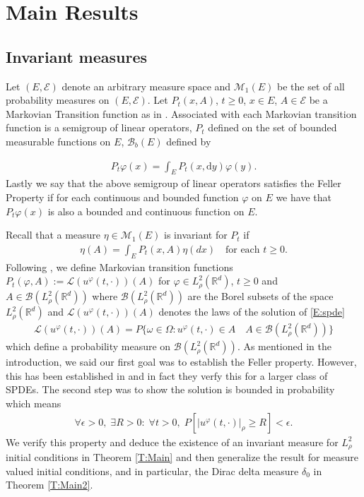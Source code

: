 \documentclass[a4paper,11pt]{article}%
\numberwithin{equation}{section}
\theoremstyle{plain}
\theoremstyle{definition}
\newcommand{\R}{\mathbb{R}}
\newcommand{\ud}{\ensuremath{ \mathrm{d} }}
\begin{document}
\section{Main Results}
\subsection{Invariant measures}
Let $(E, \mathscr E)$ denote an arbitrary measure space and $\mathcal M_1(E)$ be the set of all probability measures on $(E, \mathscr E)$. Let $P_t(x,A)$, $t\ge0$, $x\in E$, $A \in \mathscr E$ be a Markovian Transition function as in \cite{DZ96}. Associated with each Markovian transition function is a semigroup of linear operators, $P_t$ defined on the set of bounded measurable functions on $E$, $\mathcal B_b(E)$ defined by

\begin{align*}
	P_t \varphi (x) = \int_E P_t(x,\ud y)\varphi(y).
\end{align*}
Lastly we say that the above semigroup of linear operators satisfies the Feller Property if for each continuous and bounded function $\varphi$ on $E$ we have that $P_t\varphi (x)$ is also a bounded and continuous function on $E$.

Recall that a measure $\eta \in \mathcal M_1(E)$ is invariant for $P_t$ if
\begin{align*}
	\eta(A)=\int_E P_t(x,A)\eta(dx) \quad \text{for each $t\ge 0$}.
\end{align*}
Following \cite{DZ96}, we define Markovian transition functions $P_t(\varphi,A) := \mathscr L (u^\varphi(t,\cdot))(A)$ for $\varphi \in L^2_{\rho}(\R^d)$, $t \ge 0$ and $A \in \mathscr B (L^2_{\rho}(\R^d))$ where $\mathscr B (L^2_\rho(\R^d))$ are the Borel subsets of the space $L^2_\rho(\R^d)$ and $\mathscr L (u^\varphi(t,\cdot))(A)$ denotes the laws of the solution of \eqref{E:spde}
\begin{align*}
	\mathscr L (u^\varphi(t,\cdot))(A) = P\{\omega \in \Omega : u^\varphi(t,\cdot) \in A \quad A \in \mathscr B(L^2_\rho(\R^d))\}
\end{align*}
which define a probability measure on $\mathscr B(L^2_\rho(\R^d))$. As mentioned in the introduction, we said our first goal was to establish the Feller property. However, this has been established in \cite{DZ96} and in fact they verfy this for a larger class of SPDEs. The second step was to show the solution is bounded in probability which means
\begin{align*}
	\forall \epsilon >0, \; \exists R>0: \; \forall t>0, \; P[|u^\varphi(t,\cdot)|_\rho \ge R] <  \epsilon .
\end{align*}
We verify this property and deduce the existence of an invariant measure for $L^2_\rho$ initial conditions in Theorem
\ref{T:Main} and then generalize the result for measure valued initial conditions, and in particular, the Dirac delta
measure $\delta_0$ in Theorem \ref{T:Main2}.
\end{document}
